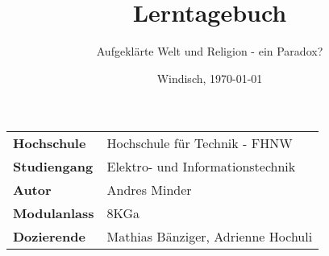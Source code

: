 \documentclass[final]{fhnwreport}       %
\title{\Huge{\textbf{Lerntagebuch}}\\}          %
\author{\huge{\glqq Aufgeklärte Welt und Religion - ein Paradox?\grqq}}          %
\date{Windisch, \today}             %
\begin{document}
\maketitle
\vspace*{-0.5cm}						    %
\vfill
\begin{figure}[H]
\centering
\end{figure}
\vfill

{
\renewcommand\arraystretch{2}
\begin{center}
\begin{tabular}{>{\bf}p{4cm} l}
Hochschule                 &    Hochschule für Technik - FHNW\\
Studiengang                &    Elektro- und Informationstechnik\\
Autor	  		           & 	Andres Minder\\
Modulanlass	               &    8KGa\\
Dozierende                 &    Mathias Bänziger, Adrienne Hochuli\\
\end{tabular}
\end{center}
}

\clearpage
			
\thispagestyle{empty}
%

\clearpage


\setcounter{page}{1}
\tableofcontents
\newpage









{\sloppypar
\printbibliography[heading=bibintoc]
\label{sec:lit}
}

%

\ifdraft{%
\newpage
\clearpage
}
{%
}
\end{document}
